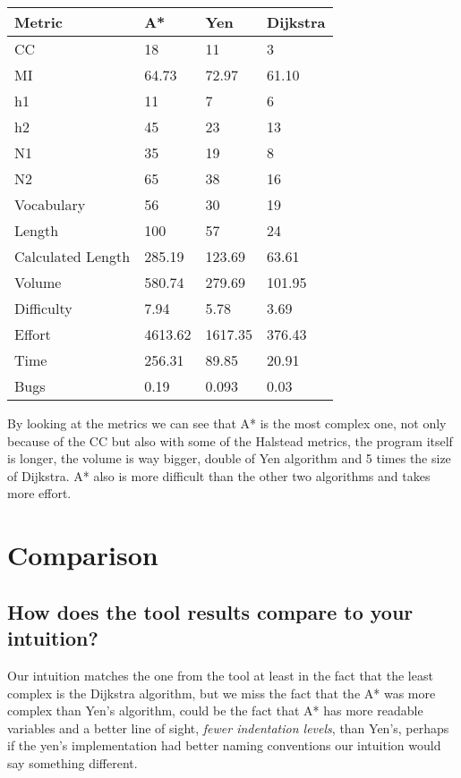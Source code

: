 \begin{center}
    \begin{tabular}{|p{3cm} | p{2cm} | p{2cm}| p{2cm}|}
        \hline
        \textbf{Metric} & \textbf{A*} & \textbf{Yen} & \textbf{Dijkstra}\\
        \hline
        CC & 18 & 11 & 3\\ 
        \hline
        MI & 64.73 & 72.97 & 61.10 \\  
        \hline
        h1 & 11 & 7 & 6 \\
        \hline
        h2 & 45 & 23 & 13  \\
        \hline
        N1 & 35 & 19 & 8  \\
        \hline
        N2 & 65 & 38 & 16 \\
        \hline
        Vocabulary & 56 & 30 & 19  \\
        \hline
        Length & 100 & 57 & 24  \\
        \hline
        Calculated Length & 285.19 & 123.69 & 63.61 \\
        \hline
        Volume & 580.74 & 279.69 & 101.95  \\
        \hline
        Difficulty & 7.94 & 5.78 & 3.69 \\
        \hline
        Effort & 4613.62 & 1617.35 & 376.43 \\
        \hline
        Time & 256.31 & 89.85 & 20.91 \\
        \hline
        Bugs & 0.19 & 0.093 &  0.03\\
        \hline
    \end{tabular}
\end{center}

\noindent
By looking at the metrics we can see that A* is the most complex one, not only because of the CC but also with some of the Halstead metrics, the program itself is longer, the volume is way bigger, double of Yen algorithm and 5 times the size of Dijkstra. A* also is more difficult than the other two algorithms and takes more effort.

\pagebreak

\section{Comparison}
\subsection{How does the tool results compare to your intuition?}
Our intuition matches the one from the tool at least in the fact that the least complex is the Dijkstra algorithm, but we miss the fact that the A* was more complex than Yen's algorithm, could be the fact that A* has more readable variables and a better line of sight, \textit{fewer indentation levels}, than Yen's, perhaps if the yen's implementation had better naming conventions our intuition would say something different.

